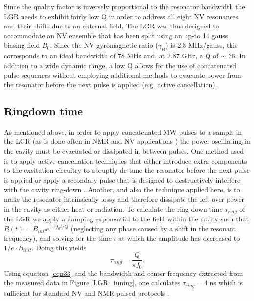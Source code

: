 Since the quality factor is inversely proportional to the resonator bandwidth the LGR needs to exhibit fairly low Q in order to address all eight NV resonances and their shifts due to an external field. The LGR was thus designed to accommodate an NV ensemble that has been split using an up-to 14 gauss biasing field $B_0$. Since the NV gyromagnetic ratio ($\gamma_B$) is 2.8 MHz/gauss, this corresponds to an ideal bandwidth of 78 MHz and, at 2.87 GHz, a Q of $\sim$ 36. In addition to a wide dynamic range, a low Q allows for the use of concatenated pulse sequences without employing additional methods to evacuate power from the resonator before the next pulse is applied (e.g. active cancellation). 

\subsection{Ringdown time}\label{ringdown}

As mentioned above, in order to apply concatenated MW pulses to a sample in the LGR (as is done often in NMR and NV applications \cite{wang2012comparison, carr1954effects}) the power oscillating in the cavity must be evacuated or dissipated in between pulses. One method used is to apply active cancellation techniques that either introduce extra components to the excitation circuitry to abruptly de-tune the resonator before the next pulse is applied  \cite{peshkovsky2005rf} or apply a secondary pulse that is designed to destructively interfere with the cavity ring-down \cite{Franck2015Active}. Another, and also the technique applied here, is to make the resonator intrinsically lossy and therefore dissipate the left-over power in the cavity as either heat or radiation. To calculate the ring-down time $\tau_{ring}$ of the LGR we apply a damping exponential to the field within the cavity such that $B(t) = B_{init}e^{-\pi f_0t/Q}$ (neglecting any phase caused by a shift in the resonant frequency), and solving for the time $t$ at which the amplitude has decreased to $1/e \cdot B_{init}$. Doing this yields
\begin{equation}\label{eqn33}
\tau_{ring} = \frac{Q}{\pi f_0}.
\end{equation} 
Using equation \ref{eqn33} and the bandwidth and center frequency extracted from the measured data in Figure \ref{LGR_tuning}, one calculates $\tau_{ring} = 4$ ns which is sufficient for standard NV and NMR pulsed protocols \cite{Smeltzer2009Robust,Jelezko2004Observation,Steiner2010Universal}.

